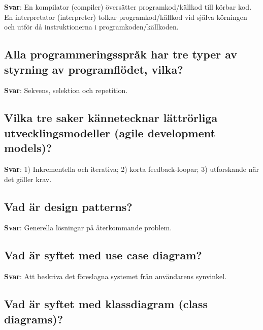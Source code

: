 \documentclass[a4paper,11pt,oneside]{article}
\begin{document}
\begin{sloppypar}
\label{q:220:sa:sv:True}

\textbf{Svar}: En kompilator (compiler) \"overs\"atter programkod/k\"allkod till k\"orbar kod. En interpretator (interpreter) tolkar programkod/k\"allkod vid sj\"alva k\"orningen och utf\"or d\r{a} instruktionerna i programkoden/k\"allkoden.



\subsection{Alla programmeringsspr\r{a}k har tre typer av styrning av programfl\"odet, vilka?}

\label{q:221:sa:sv:True}

\textbf{Svar}: Sekvens, selektion och repetition.



\subsection{Vilka tre saker k\"annetecknar l\"attr\"orliga utvecklingsmodeller (agile development models)?}

\label{q:222:sa:sv:True}

\textbf{Svar}: 1) Inkrementella och iterativa; 2) korta feedback-loopar; 3) utforskande n\"ar det g\"aller krav.



\subsection{Vad \"ar design patterns?}

\label{q:223:sa:sv:True}

\textbf{Svar}: Generella l\"osningar p\r{a} \r{a}terkommande problem.



\subsection{Vad \"ar syftet med use case diagram?}

\label{q:224:sa:sv:True}

\textbf{Svar}: Att beskriva det f\"oreslagna systemet fr\r{a}n anv\"andarens synvinkel.



\subsection{Vad \"ar syftet med klassdiagram (class diagrams)?}


\end{sloppypar}
\end{document}
